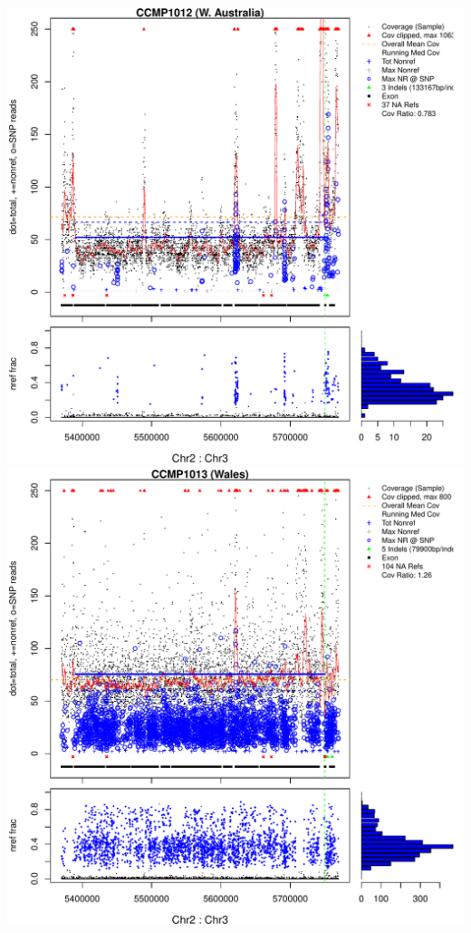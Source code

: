 \documentclass{article}\usepackage[]{graphicx}\usepackage[]{color}
\makeatletter
\def\maxwidth{ %
  \ifdim\Gin@nat@width>\linewidth
    \linewidth
  \else
    \Gin@nat@width
  \fi
}
\newenvironment{knitrout}{}{} %
\makeatother
\begin{document}
\begin{knitrout}
{\includegraphics[width=\maxwidth]{figs-knitr/unnamed-chunk-37-3} 
\includegraphics[width=\maxwidth]{figs-knitr/unnamed-chunk-37-4} 
}
\end{knitrout}
\end{document}
